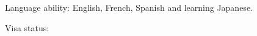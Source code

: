 
\begin{rlist}
  \item Language ability: English, French, Spanish and learning Japanese.
  \item Visa status: \myVisa 
\end{rlist}

